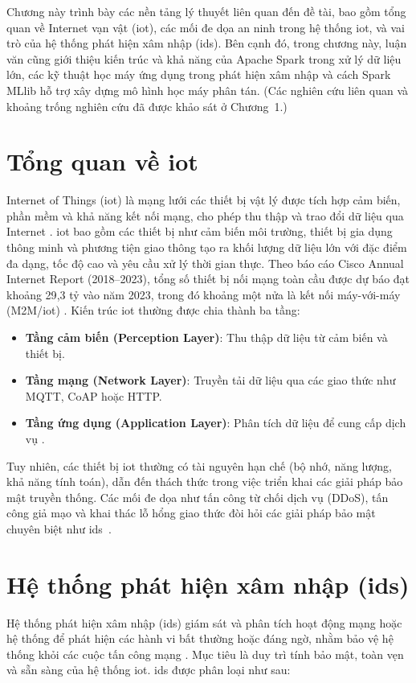 Chương này trình bày các nền tảng lý thuyết liên quan đến đề tài, bao gồm tổng quan về Internet vạn vật (\ac{iot}), các mối đe dọa an ninh trong hệ thống \ac{iot}, và vai trò của hệ thống phát hiện xâm nhập (\ac{ids}). Bên cạnh đó, trong chương này, luận văn cũng giới thiệu kiến trúc và khả năng của Apache Spark trong xử lý dữ liệu lớn, các kỹ thuật học máy ứng dụng trong phát hiện xâm nhập và cách Spark MLlib hỗ trợ xây dựng mô hình học máy phân tán. (Các nghiên cứu liên quan và khoảng trống nghiên cứu đã được khảo sát ở Chương~1.)

\section{Tổng quan về \ac{iot}}
Internet of Things (\ac{iot}) là mạng lưới các thiết bị vật lý được tích hợp cảm biến, phần mềm và khả năng kết nối mạng, cho phép thu thập và trao đổi dữ liệu qua Internet \cite{Atzori2010}. \ac{iot} bao gồm các thiết bị như cảm biến môi trường, thiết bị gia dụng thông minh và phương tiện giao thông tạo ra khối lượng dữ liệu lớn với đặc điểm đa dạng, tốc độ cao và yêu cầu xử lý thời gian thực. Theo báo cáo Cisco Annual Internet Report (2018--2023), tổng số thiết bị nối mạng toàn cầu được dự báo đạt khoảng 29{,}3 tỷ vào năm 2023, trong đó khoảng một nửa là kết nối máy-với-máy (M2M/\ac{iot}) \cite{Cisco2023}. Kiến trúc \ac{iot} thường được chia thành ba tầng:
\begin{itemize}
  \item \textbf{Tầng cảm biến (Perception Layer)}: Thu thập dữ liệu từ cảm biến và thiết bị.
  \item \textbf{Tầng mạng (Network Layer)}: Truyền tải dữ liệu qua các giao thức như MQTT, CoAP hoặc HTTP.
  \item \textbf{Tầng ứng dụng (Application Layer)}: Phân tích dữ liệu để cung cấp dịch vụ \cite{Khan2012}.
\end{itemize}

Tuy nhiên, các thiết bị \ac{iot} thường có tài nguyên hạn chế (bộ nhớ, năng lượng, khả năng tính toán), dẫn đến thách thức trong việc triển khai các giải pháp bảo mật truyền thống. Các mối đe dọa như tấn công từ chối dịch vụ (DDoS), tấn công giả mạo và khai thác lỗ hổng giao thức đòi hỏi các giải pháp bảo mật chuyên biệt như \ac{ids}~\cite{HaddadPajouh2021}.

\section{Hệ thống phát hiện xâm nhập (\ac{ids})}
Hệ thống phát hiện xâm nhập (\ac{ids}) giám sát và phân tích hoạt động mạng hoặc hệ thống để phát hiện các hành vi bất thường hoặc đáng ngờ, nhằm bảo vệ hệ thống khỏi các cuộc tấn công mạng \cite{Liao2013}. Mục tiêu là duy trì tính bảo mật, toàn vẹn và sẵn sàng của hệ thống \ac{iot}. \ac{ids} được phân loại như sau:

